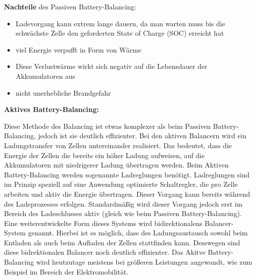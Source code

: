 \textbf{Nachteile} des Passiven Battery-Balancing:
\begin{itemize}
\item {Ladevorgang kann extrem lange dauern, da man warten muss bis die schwächste Zelle den geforderten State of Charge (SOC) erreicht hat} \medskip\\
\item {viel Energie verpufft in Form von Wärme} \medskip\\
\item {Diese Verlustwärme wirkt sich negativ auf die Lebensdauer der Akkumulatoren aus} \medskip\\
\item {nicht unerhebliche Brandgefahr} \medskip\\
\end{itemize}
\newpage

\textbf{Aktives Battery-Balancing:}

Diese Methode des Balancing ist etwas komplexer als beim Passiven Battery-Balancing, jedoch ist sie deutlich effizienter. Bei den aktiven Balancern wird ein Ladungstransfer von Zellen untereinander realisiert. Das bedeutet, dass die Energie der Zellen die bereits ein höher Ladung aufweisen, auf die Akkumulatoren mit niedrigerer Ladung übertragen werden. Beim Aktiven Battery-Balancing werden sogenannte Ladreglungen benötigt. Ladreglungen sind im Prinzip speziell auf eine Anwendung optimierte Schaltregler, die pro Zelle arbeiten und aktiv die Energie übertragen. Dieser Vorgang kann bereits während des Ladeprozesses erfolgen. Standardmäßig wird dieser Vorgang jedoch erst im Bereich des Ladeschlusses aktiv (gleich wie beim Passiven Battery-Balancing). Eine weiterentwickelte Form dieses Systems wird bidirektionalens Balancer-System genannt. Hierbei ist es möglich, dass des Ladungsaustausch sowohl beim Entladen als auch beim Aufladen der Zellen stattfinden kann. Desswegen sind diese bidrektionalen Balancer noch deutlich effizienter. Das Akitve Battery-Balancing wird heutzutage meistens bei größeren Leistungen angewandt, wie zum Beispiel im Bereich der Elektromobilität.

